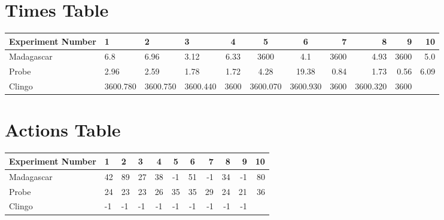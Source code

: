 \documentclass[8pt]{article}
\begin{document}
\begin{landscape}
\section{Times Table}\begin{tabular}{ | l | l | l | l | c | c | c | r | r | r | r | }\hline
Experiment Number & 1 & 2 & 3 & 4 & 5 & 6 & 7 & 8 & 9 & 10\\  \hline
Madagascar & 6.8 & 6.96 & 3.12 & 6.33 & 3600 & 4.1 & 3600 & 4.93 & 3600 & 5.0\\  \hline
Probe & 2.96 & 2.59 & 1.78 & 1.72 & 4.28 & 19.38 & 0.84 & 1.73 & 0.56 & 6.09\\  \hline
Clingo & 3600.780 & 3600.750 & 3600.440 & 3600 & 3600.070 & 3600.930 & 3600 & 3600.320 & 3600\\  \hline
\end{tabular}
\section{Actions Table}\begin{tabular}{ | l | l | l | l | c | c | c | r | r | r | r | }\hline
Experiment Number & 1 & 2 & 3 & 4 & 5 & 6 & 7 & 8 & 9 & 10\\ \hline
 Madagascar & 42 & 89 & 27 & 38 & -1 & 51 & -1 & 34 & -1 & 80\\ \hline
 Probe & 24 & 23 & 23 & 26 & 35 & 35 & 29 & 24 & 21 & 36\\ \hline
 Clingo & -1 & -1 & -1 & -1 & -1 & -1 & -1 & -1 & -1\\ \hline
\end{tabular}
\end{landscape}
\end{document}
